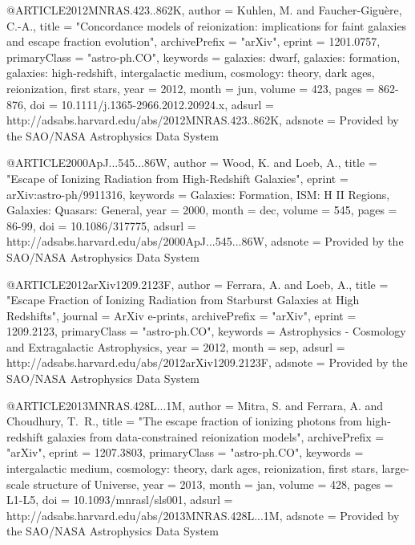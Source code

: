 \documentclass{article}
\begin{document}
@ARTICLE{2012MNRAS.423..862K,
   author = {{Kuhlen}, M. and {Faucher-Gigu{\`e}re}, C.-A.},
    title = "{Concordance models of reionization: implications for faint galaxies and escape fraction evolution}",
archivePrefix = "arXiv",
   eprint = {1201.0757},
 primaryClass = "astro-ph.CO",
 keywords = {galaxies: dwarf, galaxies: formation, galaxies: high-redshift, intergalactic medium, cosmology: theory, dark ages, reionization, first stars},
     year = 2012,
    month = jun,
   volume = 423,
    pages = {862-876},
      doi = {10.1111/j.1365-2966.2012.20924.x},
   adsurl = {http://adsabs.harvard.edu/abs/2012MNRAS.423..862K},
  adsnote = {Provided by the SAO/NASA Astrophysics Data System}
}

@ARTICLE{2000ApJ...545...86W,
   author = {{Wood}, K. and {Loeb}, A.},
    title = "{Escape of Ionizing Radiation from High-Redshift Galaxies}",
   eprint = {arXiv:astro-ph/9911316},
 keywords = {Galaxies: Formation, ISM: H II Regions, Galaxies: Quasars: General},
     year = 2000,
    month = dec,
   volume = 545,
    pages = {86-99},
      doi = {10.1086/317775},
   adsurl = {http://adsabs.harvard.edu/abs/2000ApJ...545...86W},
  adsnote = {Provided by the SAO/NASA Astrophysics Data System}
}

@ARTICLE{2012arXiv1209.2123F,
   author = {{Ferrara}, A. and {Loeb}, A.},
    title = "{Escape Fraction of Ionizing Radiation from Starburst Galaxies at High Redshifts}",
  journal = {ArXiv e-prints},
archivePrefix = "arXiv",
   eprint = {1209.2123},
 primaryClass = "astro-ph.CO",
 keywords = {Astrophysics - Cosmology and Extragalactic Astrophysics},
     year = 2012,
    month = sep,
   adsurl = {http://adsabs.harvard.edu/abs/2012arXiv1209.2123F},
  adsnote = {Provided by the SAO/NASA Astrophysics Data System}
}

@ARTICLE{2013MNRAS.428L...1M,
   author = {{Mitra}, S. and {Ferrara}, A. and {Choudhury}, T.~R.},
    title = "{The escape fraction of ionizing photons from high-redshift galaxies from data-constrained reionization models}",
archivePrefix = "arXiv",
   eprint = {1207.3803},
 primaryClass = "astro-ph.CO",
 keywords = {intergalactic medium, cosmology: theory, dark ages, reionization, first stars, large-scale structure of Universe},
     year = 2013,
    month = jan,
   volume = 428,
    pages = {L1-L5},
      doi = {10.1093/mnrasl/sls001},
   adsurl = {http://adsabs.harvard.edu/abs/2013MNRAS.428L...1M},
  adsnote = {Provided by the SAO/NASA Astrophysics Data System}
}
\end{document}
